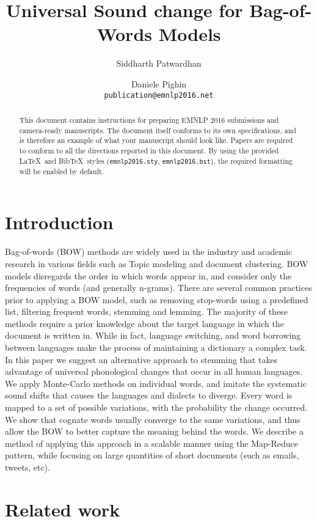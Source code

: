 \documentclass[11pt,letterpaper]{article}
\title{Universal Sound change for Bag-of-Words Models}
\author{Siddharth Patwardhan \and Daniele Pighin\\
  {\tt publication@emnlp2016.net}}
\date{}
\newcommand\BibTeX{B{\sc ib}\TeX}
\begin{document}
\maketitle

\begin{abstract}
  This document contains instructions for preparing EMNLP 2016 submissions
  and camera-ready manuscripts.  The document itself conforms to its own
  specifications, and is therefore an example of what your manuscript
  should look like.  Papers are required to conform to all the directions
  reported in this document. By using the provided \LaTeX\ and
  \BibTeX\ styles ({\small\tt emnlp2016.sty}, {\small\tt emnlp2016.bst}),
  the required formatting will be enabled by default.
\end{abstract}


\section{Introduction}

Bag-of-words (BOW) methods are widely used in the industry and academic research in various fields such as Topic modeling and document clustering.
BOW models disregards the order in which words appear in, and consider only the frequencies of words (and generally n-grams).
There are several common practices prior to applying a BOW model, such as removing stop-words using a predefined list, filtering frequent words, stemming and lemming.
The majority of these methods require a prior knowledge about the target language in which the document is written in.
While in fact, language switching, and word borrowing between languages make the process of maintaining a dictionary a complex task.
In this paper we suggest an alternative approach to stemming that takes advantage of universal phonological changes that occur in all human languages.
We apply Monte-Carlo methods on individual words, and imitate the systematic sound shifts that causes the languages and dialects to diverge.
Every word is mapped to a set of possible variations, with the probability the change occurred. We show that cognate words usually converge to the same variations, and thus allow the BOW to better capture the meaning behind the words. 
We describe a method of applying this approach in a scalable manner using the Map-Reduce pattern, while focusing on large quantities of short documents (such as emails, tweets, etc).

\section{Related work}
\end{document}
